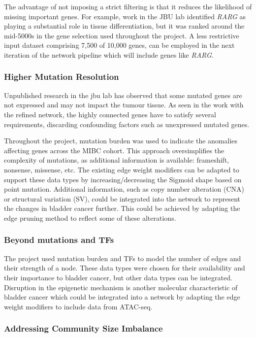 The advantage of not imposing a strict filtering is that it reduces the likelihood of missing important genes. For example, work in the JBU lab identified \textit{RARG} as playing a substantial role in tissue differentiation, but it was ranked around the mid-5000s in the gene selection used throughout the project. A less restrictive input dataset comprising 7,500 of 10,000 genes, can be employed in the next iteration of the network pipeline which will include genes like \textit{RARG}.

\subsubsection*{Higher Mutation Resolution}

Unpublished research in the \acrlong{jbu} lab has observed that some mutated genes are not expressed and may not impact the tumour tissue. As seen in the work with the refined network, the highly connected genes have to satisfy several requirements, discarding confounding factors such as unexpressed mutated genes.

Throughout the project, mutation burden was used to indicate the anomalies affecting genes across the MIBC cohort. This approach oversimplifies the complexity of mutations, as additional information is available: frameshift, nonsense, missense, etc. The existing edge weight modifiers can be adapted to support these data types by increasing/decreasing the Sigmoid shape based on point mutation. Additional information, such as copy number alteration (CNA) or structural variation (SV), could be integrated into the network to represent the changes in bladder cancer further. This could be achieved by adapting the edge pruning method to reflect some of these alterations.

\subsubsection*{Beyond mutations and TFs}

The project used mutation burden and TFs to model the number of edges and their strength of a node. These data types were chosen for their availability and their importance to bladder cancer, but other data types can be integrated. Disruption in the epigenetic mechanism is another molecular characteristic of bladder cancer which could be integrated into a network by adapting the edge weight modifiers to include data from ATAC-seq.


\subsubsection*{Addressing Community Size Imbalance}

